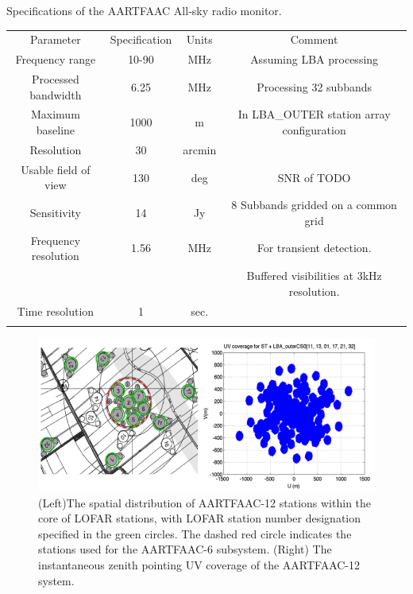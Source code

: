 \documentclass{ws-jai}
\begin{document}
\begin{wstable}[h]
\caption{Specifications of the AARTFAAC All-sky radio monitor.}
\begin{tabular}{@{}cccc@{}} \toprule
Parameter & Specification & Units & Comment\\ \colrule
Frequency range & 10-90 & MHz & Assuming LBA processing  \\
Processed bandwidth & 6.25 & MHz & Processing 32 subbands \\
Maximum baseline & 1000 & m & In LBA\_OUTER station array configuration\\
Resolution & 30 & arcmin & \\
Usable field of view & 130 & deg & SNR of TODO \\
Sensitivity & 14 & Jy & 8 Subbands gridded on a common grid \\
Frequency resolution & 1.56 & MHz & For transient detection. \\
 & & & Buffered visibilities at 3kHz resolution.\\
Time resolution & 1 & sec.\\ \colrule

\end{tabular}
\label{tab:afaac_specs}
\end{wstable}

\begin{figure}[htbp]
\includegraphics[width=\textwidth]{Figs/A12_config_uvcov/Slide1.png}
\caption{(Left)The spatial distribution of AARTFAAC-12 stations within the core of LOFAR stations, with LOFAR station number designation specified in the green circles. The dashed red circle indicates the stations used for the AARTFAAC-6 subsystem. (Right) The instantaneous zenith pointing UV coverage of the AARTFAAC-12 system.}
\label{fig:afaac12_arrayconfig}
\end{figure}
\end{document}
